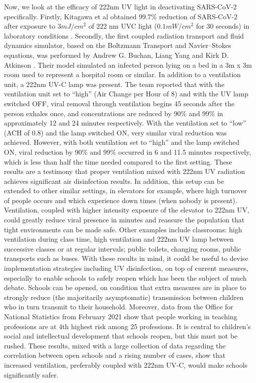 \documentclass[11pt]{report}
\begin{document}
Now, we look at the efficacy of 222nm UV light in deactivating SARS-CoV-2 specifically. Firstly, Kitagawa et al obtained 99.7\% reduction of SARS-CoV-2 after exposure to $3mJ/cm^2$ of 222 nm UVC light ($0.1mW/cm^2$ for 30 seconds) in laboratory conditions \cite{kitagawa}. 
Secondly, the first coupled radiation transport and fluid dynamics simulator, based on the Boltzmann Transport and Navier–Stokes equations, was performed by Andrew G. Buchan, Liang Yang and Kirk D. Atkinson \cite{room}. Their model simulated an infected person lying on a bed in a 3m x 3m room used to represent a hospital room or similar. In addition to a ventilation unit, a 222nm UV-C lamp was present. The team reported that with the ventilation unit set to “high” (Air Change per Hour of 8) and with the UV lamp switched OFF, viral removal through ventilation begins 45 seconds after the person exhales once, and concentrations are reduced by 90\% and 99\% in approximately 12 and 24 minutes respectively. With the ventilation set to “low” (ACH of 0.8) and the lamp switched ON, very similar viral reduction was achieved. However, with both ventilation set to “high” and the lamp switched ON, viral reduction by 90\% and 99\% occurred in 6 and 11.5 minutes respectively, which is less than half the time needed compared to the first setting. These results are a testimony that proper ventilation mixed with 222nm UV radiation achieves significant air disinfection results. In addition, this setup can be extended to other similar settings, in elevators for example, where high turnover of people occurs and which experience down times (when nobody is present). Ventilation, coupled with higher intensity exposure of the elevator to 222nm UV, could greatly reduce viral presence in minutes and reassure the population that tight environments can be made safe. Other examples include classrooms: high ventilation during class time, high ventilation and 222nm UV lamp between successive classes or at regular intervals; public toilets, changing rooms, public transports such as buses. With these results in mind, it could be useful to devise implementation strategies including UV disinfection, on top of current measures, especially to enable schools to safely reopen which has been the subject of much debate. Schools can be opened, on condition that extra measures are in place to strongly reduce (the majoritarily asymptomatic) transmission between children who in turn transmit to their household. Moreover, data from the Office for National Statistics from February 2021 show that people working in teaching professions are at 4th highest risk among 25 professions. It is central to children’s social and intellectual development that schools reopen, but this must not be rushed. These results, mixed with a large collection of data regarding the correlation between open schools and a rising number of cases, show that increased ventilation, preferably coupled with 222nm UV-C, would make schools significantly safer.
 
\end{document}
